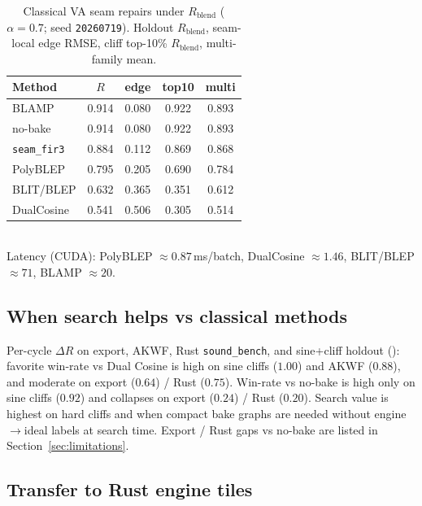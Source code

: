 \begin{table}[t]
  \centering
  \caption{Classical VA seam repairs under $R_{\mathrm{blend}}$ ($\alpha{=}0.7$; seed \texttt{20260719}).
  Holdout $R_{\mathrm{blend}}$, seam-local edge RMSE, cliff top-10\% $R_{\mathrm{blend}}$, multi-family mean.}
  \label{tab:va-seam-blep}
  \setlength{\tabcolsep}{3pt}
  \footnotesize
  \begin{tabular}{@{}lcccc@{}}
    \toprule
    Method & $R$ & edge & top10 & multi \\
    \midrule
    BLAMP & 0.914 & 0.080 & 0.922 & 0.893 \\
    no-bake & 0.914 & 0.080 & 0.922 & 0.893 \\
    \texttt{seam\_fir3} & 0.884 & 0.112 & 0.869 & 0.868 \\
    PolyBLEP & 0.795 & 0.205 & 0.690 & 0.784 \\
    BLIT/BLEP & 0.632 & 0.365 & 0.351 & 0.612 \\
    DualCosine & 0.541 & 0.506 & 0.305 & 0.514 \\
    \bottomrule
  \end{tabular}\\[0.35em]
  {\footnotesize Latency (CUDA): PolyBLEP ${\approx}0.87$\,ms/batch, DualCosine ${\approx}1.46$, BLIT/BLEP ${\approx}71$, BLAMP ${\approx}20$.}
\end{table}





\subsection{When search helps vs classical methods}
\label{sec:transfer}

Per-cycle $\Delta R$ on export, AKWF, Rust \texttt{sound\_bench}, and sine{+}cliff holdout
():
favorite win-rate vs Dual Cosine is high on sine cliffs ($1.00$) and AKWF ($0.88$), and moderate on export ($0.64$) / Rust ($0.75$).
Win-rate vs no-bake is high only on sine cliffs ($0.92$) and collapses on export ($0.24$) / Rust ($0.20$).
Search value is highest on hard cliffs and when compact bake graphs are needed without engine$\to$ideal labels at search time.
Export / Rust gaps vs no-bake are listed in Section~\ref{sec:limitations}.

\subsection{Transfer to Rust engine tiles}
\label{sec:rust-bench}


